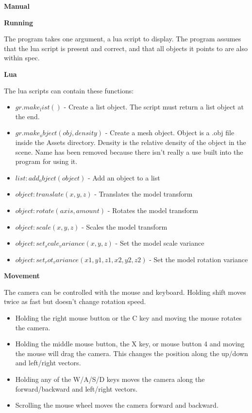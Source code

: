 \documentclass[10pt]{article}
\begin{document}
	
	\begin{center}
		\large\bf Manual
	\end{center}
	
	\begin{center}
		\bf Running
	\end{center}
	
	The program takes one argument, a lua script to display. The program assumes that the lua script is present and correct, and that all objects it points to are also within spec.
	
	\begin{center}
		\bf Lua
	\end{center}
	The lua scripts can contain these functions:
	\begin{itemize}
		\item $gr.make_list()$ - Create a list object. The script must return a list object at the end.
		\item $gr.make_object(obj, density)$ - Create a mesh object. Object is a .obj file inside the Assets directory. Density is the relative density of the object in the scene. Name has been removed because there isn't really a use built into the program for using it.
		
		\item $list:add_object(object)$ - Add an object to a list
		
		\item $object:translate(x, y, z)$ - Translates the model transform
		\item $object:rotate(axis, amount)$ - Rotates the model transform
		\item $object:scale(x, y, z)$ - Scales the model transform
		
		\item $object:set_scale_variance(x, y, z)$ - Set the model scale variance
		\item $object:set_rot_variance(x1, y1, z1, x2, y2, z2)$ - Set the model rotation variance
	\end{itemize}
	
	\begin{center}
		\bf Movement
	\end{center}
	The camera can be controlled with the mouse and keyboard. Holding shift moves twice as fast but doesn't change rotation speed.
	
	\begin{itemize}
		\item Holding the right mouse button or the C key and moving the mouse rotates the camera.
		\item Holding the middle mouse button, the X key, or mouse button 4 and moving the mouse will drag the camera. This changes the position along the up/down and left/right vectors.
		\item Holding any of the W/A/S/D keys moves the camera along the forward/backward and left/right vectors.
		\item Scrolling the mouse wheel moves the camera forward and backward.
	\end{itemize}
	
\end{document}
